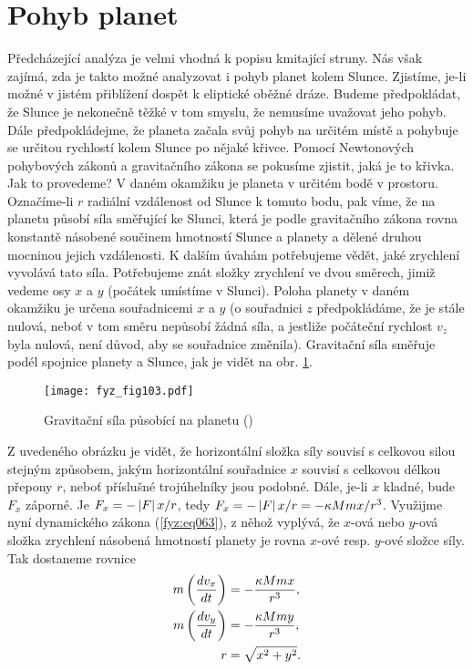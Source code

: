 {{  \section{Pohyb planet}
    Předcházející analýza je velmi vhodná k popisu kmitající stru\-ny. Nás však zajímá, zda je 
    takto 
    možné analyzovat i pohyb planet kolem Slunce. Zjistíme, je-li možné v jistém přiblížení dospět 
    k eliptické oběžné dráze. Budeme předpokládat, že Slunce je nekonečně těžké v tom smyslu, že 
    nemusíme uvažovat jeho pohyb. Dále předpokládejme, že planeta začala svůj pohyb na určitém 
    místě a pohybuje se určitou rychlostí kolem Slunce po nějaké křivce. Pomocí Newtonových 
    pohybových zákonů a gravitačního zákona se pokusíme zjistit, jaká je to křivka. Jak to 
    provedeme? V daném okamžiku je planeta v určitém bodě v prostoru. Označíme-li \(r\) radiální 
    vzdálenost od Slunce k tomuto bodu, pak víme, že na planetu působí síla směřující ke Slunci, 
    která je podle gravitačního zákona rovna konstantě násobené součinem hmotností Slunce a planety 
    a dělené druhou mocninou jejich vzdálenosti. K dalším úvahám potřebujeme vědět, jaké zrychlení 
    vyvolává tato síla. Potřebujeme znát složky zrychlení ve dvou směrech, jimiž vedeme osy \(x\) a 
    \(y\) (počátek umístíme v Slunci). Poloha planety v daném okamžiku je určena souřadnicemi \(x\) 
    a \(y\) (o souřadnici \(z\) předpokládáme, že je stále nulová, neboť v tom směru nepůsobí žádná 
    síla, a jestliže počáteční rychlost \(v_z\) byla nulová, není důvod, aby se souřadnice 
    změnila). Gravitační síla směřuje podél spojnice planety a Slunce, jak je vidět na obr. 
    \ref{fyz:fig103}.

    \begin{figure}[ht!]  %
      \centering
      \texttt{[image: fyz\_fig103.pdf]}
      \caption{Gravitační síla působící na planetu (\cite[s.~131]{Feynman01})}
      \label{fyz:fig103}
    \end{figure}
    Z uvedeného obrázku je vidět, že horizontální složka síly souvisí s celkovou silou stejným 
    způsobem, jakým horizontální souřadnice \(x\) souvisí s celkovou délkou přepony \(r\), neboť 
    příslušné trojúhelníky jsou podobné. Dále, je-li \(x\) kladné, bude \(F_x\) záporné. Je \(F_x = 
    -\left\lvert F\right\rvert x/r\), tedy \(F_x = -\left\lvert F\right\rvert x/r = -\kappa Mmx/r^3\). Využijme nyní dynamického zákona 
    (\ref{fyz:eq063}), z něhož vyplývá, že \(x\)-ová nebo \(y\)-ová složka zrychlení násobená 
    hmotností planety je rovna \(x\)-ové resp. \(y\)-ové složce síly. Tak dostaneme rovnice
    \begin{subequations}
    \label{FYZ:eq133}
    \begin{align} 
      m\left(\frac{d v_x}{d t}\right) &= -\frac{\kappa Mmx}{r^3}, \label{FYZ:eq133a}   \\
      m\left(\frac{d v_y}{d t}\right) &= -\frac{\kappa Mmy}{r^3}, \label{FYZ:eq133b}   \\
                               r &= \sqrt{x^2+y^2}.          \label{FYZ:eq133c} 
    \end{align}
    \end{subequations}
    
}}
